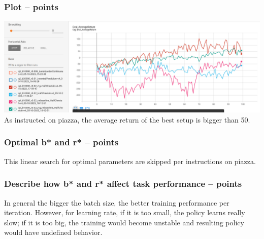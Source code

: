 \documentclass{article}
\begin{document}
\subsubsection{Plot --  points\rbrack}
\begin{answer}[title=Q7.2.2 with exp4.sh,height=10cm,width=\linewidth]
\centering
\includegraphics[width=0.9\linewidth]{Images/q4_b10000_r0.02.png}
As instructed on piazza, the average return of the best setup is bigger than 50.
\end{answer}



\subsubsection{Optimal b* and r* --  points\rbrack}
\begin{answer}[title=Q7.2.3,height=4cm,width=\linewidth]
This linear search for optimal parameters are skipped per instructions on piazza.
\end{answer}

\subsubsection{Describe how b* and r* affect task performance --  points\rbrack}
\begin{answer}[title=Q7.2.4,height=4cm,width=\linewidth]
In general the bigger the batch size, the better training performance per iteration. However, for learning rate, if it is too small, the policy learns really slow; if it is too big, the training would become unstable and resulting policy would have undefined behavior.
\end{answer}
\end{document}
